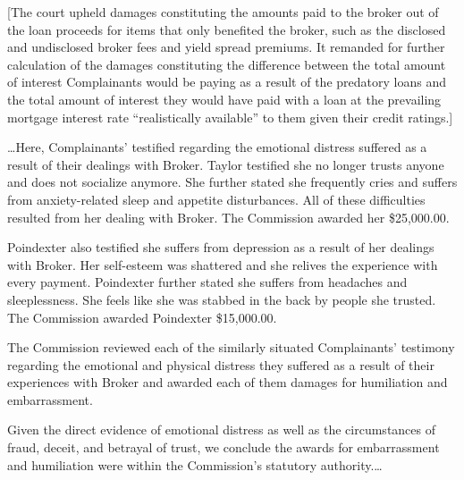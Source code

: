 [The court upheld damages constituting the amounts paid to the broker out of the
loan proceeds for items that only benefited the broker, such as the disclosed
and undisclosed broker fees and yield spread premiums.  It remanded for further
calculation of the damages constituting the difference between the total amount
of interest Complainants would be paying as a result of the predatory loans and
the total amount of interest they would have paid with a loan at the prevailing
mortgage interest rate ``realistically available'' to them given their credit
ratings.]

\dots Here, Complainants' testified regarding the emotional distress
suffered as a result of their dealings with Broker. Taylor testified she no
longer trusts anyone and does not socialize anymore. She further stated she
frequently cries and suffers from anxiety-related sleep and appetite
disturbances. All of these difficulties resulted from her dealing with Broker.
The Commission awarded her \$25,000.00. 

Poindexter also testified she suffers from depression as a result of her
dealings with Broker. Her self-esteem was shattered and she relives the
experience with every payment. Poindexter further stated she suffers from
headaches and sleeplessness. She feels like she was stabbed in the back by
people she trusted. The Commission awarded Poindexter \$15,000.00. 

The Commission reviewed each of the similarly situated Complainants' testimony
regarding the emotional and physical distress they suffered as a result of
their experiences with Broker and awarded each of them damages for humiliation
and embarrassment. 

Given the direct evidence of emotional distress as well as the circumstances of
fraud, deceit, and betrayal of trust, we conclude the awards for embarrassment
and humiliation were within the Commission's statutory authority.\ldots

